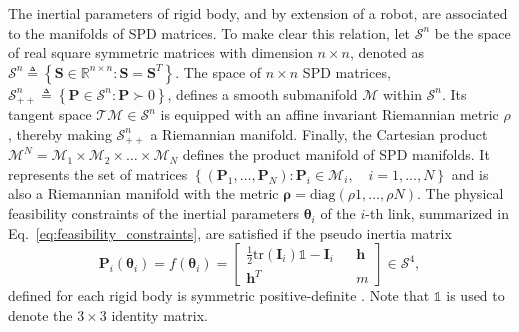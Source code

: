 The inertial parameters of rigid body, and by extension of a robot, are associated to the manifolds of SPD matrices. To make clear this relation, let $\mathcal{S}^n$ be the space of real square symmetric matrices with dimension $n \times n$, denoted as $\mathcal{S}^n \triangleq\left\lbrace \bm{S} \in \mathbb{R}^{n \times n} : \bm{S} = \bm{S}^T\right\rbrace$. The space of $n \times n$ SPD matrices, $\mathcal{S}^n_{++}\triangleq \left\lbrace \bm{P}\in \mathcal{S}^n : \bm{P} \succ 0 \right\rbrace$, defines a smooth submanifold $\mathcal{M}$ within $\mathcal{S}^n$. Its tangent space $\mathcal{T}\mathcal{M} \in \mathcal{S}^n$ is equipped with an affine invariant Riemannian metric $\rho$ \cite{Lee2018geometricalgorithmrobust}, thereby making $ \mathcal{S}^n_{++} $ a Riemannian manifold. Finally, the Cartesian product $\mathcal{M}^N =\mathcal{M}_1\times \mathcal{M}_2\times \ldots \times \mathcal{M}_N$ defines the product manifold of SPD manifolds.  It represents the set of matrices $\left\lbrace \left(\bm{P}_1,\ldots,\bm{P}_N\right):\bm{P}_i\in\mathcal{M}_i,\quad i=1,\ldots,N\right\rbrace$ and is also a Riemannian manifold with the metric $ \bm{\rho} =\text{diag}\left( \rho{1},\ldots, \rho{N} \right) $. The physical feasibility constraints of the inertial parameters $\bm{\theta}_i$ of the $i$-th link, summarized in Eq.~\eqref{eq:feasibility_constraints}, are satisfied if the pseudo inertia matrix 
\begin{equation}\label{eq:pseudo_inertia_matrix}
	\bm{P}_i(\bm{\theta}_i)=f(\bm{\theta}_i)=\begin{bmatrix}
		\frac{1}{2}\text{tr}(\bm{I}_i)\mathbb{1} - \bm{I}_i && \bm{h} \\ \bm{h}^T && m
	\end{bmatrix} \in \mathcal{S}^4,
\end{equation}
defined for each rigid body is symmetric positive-definite \cite{Wensing2017Linearmatrixinequalities}. %
Note that $\mathbb{1}$ is used to denote the $3 \times 3$ identity matrix. %
